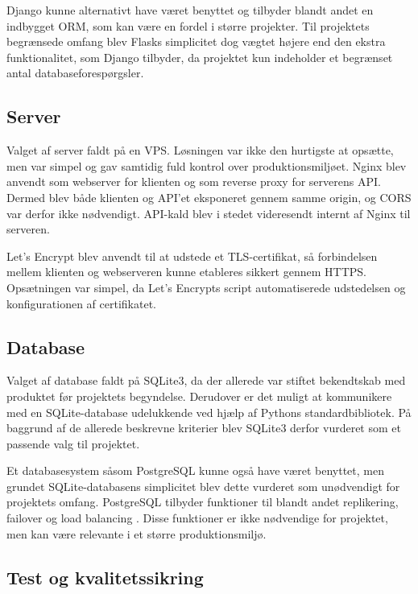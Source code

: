 \documentclass[a4paper, 11pt]{article}
\begin{document}
Django kunne alternativt have været benyttet og tilbyder blandt andet en indbygget ORM, som
kan være en fordel i større projekter. Til projektets begrænsede omfang blev Flasks
simplicitet dog vægtet højere end den ekstra funktionalitet, som Django tilbyder, da
projektet kun indeholder et begrænset antal databaseforespørgsler.

\subsection{Server}

Valget af server faldt på en VPS. Løsningen var ikke den hurtigste at opsætte, men var
simpel og gav samtidig fuld kontrol over produktionsmiljøet. Nginx blev anvendt som
webserver for klienten og som reverse proxy for serverens API. Dermed blev både klienten
og API'et eksponeret gennem samme origin, og CORS var derfor ikke nødvendigt. API-kald
blev i stedet videresendt internt af Nginx til serveren.

Let's Encrypt blev anvendt til at udstede et TLS-certifikat, så forbindelsen mellem
klienten og webserveren kunne etableres sikkert gennem HTTPS. Opsætningen var simpel, da
Let's Encrypts script automatiserede udstedelsen og konfigurationen af certifikatet.

\subsection{Database}

Valget af database faldt på SQLite3, da der allerede var stiftet bekendtskab med produktet før
projektets begyndelse. Derudover er det muligt at kommunikere med en SQLite-database
udelukkende ved hjælp af Pythons standardbibliotek. På baggrund af de allerede beskrevne
kriterier blev SQLite3 derfor vurderet som et passende valg til projektet.

Et databasesystem såsom PostgreSQL kunne også have været benyttet, men grundet
SQLite-databasens simplicitet blev dette vurderet som unødvendigt for projektets omfang.
PostgreSQL tilbyder funktioner til blandt andet replikering, failover og load balancing
\cite{postgresql_high_availability}. Disse funktioner er ikke nødvendige for projektet, men
kan være relevante i et større produktionsmiljø.

\subsection{Test og kvalitetssikring}
\end{document}
